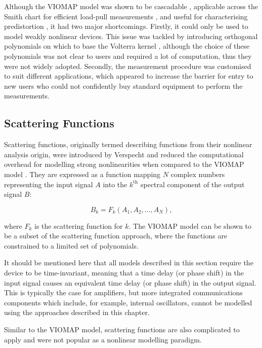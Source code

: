 \documentclass[../thesis/thesis.tex]{subfiles}
\begin{document}
\begin{refsection}
Although the VIOMAP model was shown to be cascadable \cite{Verbeyst_1994}, applicable across the Smith chart for efficient load-pull measurements \cite{Verbeyst_1995b}, and useful for characterising predistortion \cite{Verbeyst_1995}, it had two major shortcomings. Firstly, it could only be used to model weakly nonlinear devices. This issue was tackled by introducing orthogonal polynomials on which to base the Volterra kernel \cite{Verbeyst_1996}, although the choice of these polynomials was not clear to users and required a lot of computation, thus they were not widely adopted. Secondly, the measurement procedure was customised to suit different applications, which appeared to increase the barrier for entry to new users who could not confidently buy standard equipment to perform the measurements.

\subsection{Scattering Functions}

Scattering functions, originally termed describing functions from their nonlinear analysis origin, were introduced by Verspecht and reduced the computational overhead for modelling strong nonlinearities when compared to the VIOMAP model \cite{Verspecht_1996}. They are expressed as a function mapping $N$ complex numbers representing the input signal $A$ into the $k^{\textrm{th}}$ spectral component of the output signal $B$:

\begin{equation}
	B_{k} = F_k(A_1, A_2, \dots, A_N),
	\label{ch5_eqn_scatfunc}
\end{equation}

where $F_k$ is the scattering function for $k$. The VIOMAP model can be shown to be a subset of the scattering function approach, where the functions are constrained to a limited set of polynomials.

It should be mentioned here that all models described in this section require the device to be time-invariant, meaning that a time delay (or phase shift) in the input signal causes an equivalent time delay (or phase shift) in the output signal. This is typically the case for amplifiers, but more integrated communications components which include, for example, internal oscillators, cannot be modelled using the approaches described in this chapter.

Similar to the VIOMAP model, scattering functions are also complicated to apply and were not popular as a nonlinear modelling paradigm.


\end{refsection}
\end{document}

